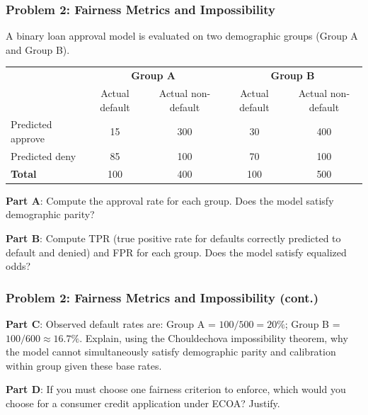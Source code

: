 \documentclass[9pt,t]{beamer}
\begin{document}
\begin{frame}
\frametitle{Problem 2: Fairness Metrics and Impossibility}

A binary loan approval model is evaluated on two demographic groups (Group A and Group B).

\begin{center}
\scriptsize
\begin{tabular}{lcccc}
\toprule
 & \multicolumn{2}{c}{\textbf{Group A}} & \multicolumn{2}{c}{\textbf{Group B}} \\
 & Actual default & Actual non-default & Actual default & Actual non-default \\
\midrule
Predicted approve & 15 & 300 & 30 & 400 \\
Predicted deny   & 85 & 100 & 70 & 100 \\
\midrule
\textbf{Total}   & 100 & 400 & 100 & 500 \\
\bottomrule
\end{tabular}
\end{center}

\textbf{Part A}: Compute the approval rate for each group. Does the model satisfy demographic parity?

\textbf{Part B}: Compute TPR (true positive rate for defaults correctly predicted to default and denied) and FPR for each group. Does the model satisfy equalized odds?
\end{frame}

\begin{frame}
\frametitle{Problem 2: Fairness Metrics and Impossibility (cont.)}

\textbf{Part C}: Observed default rates are: Group A = $100/500 = 20\%$; Group B = $100/600 \approx 16.7\%$. Explain, using the Chouldechova impossibility theorem, why the model cannot simultaneously satisfy demographic parity and calibration within group given these base rates.

\medskip
\textbf{Part D}: If you must choose one fairness criterion to enforce, which would you choose for a consumer credit application under ECOA? Justify.
\end{frame}
\end{document}
